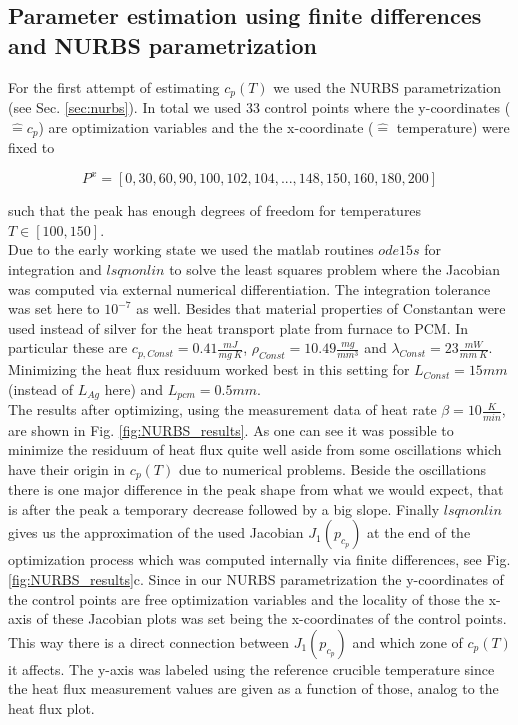 \documentclass{scrartcl}[12pt, halfparskip]
\numberwithin{equation}{section}
\numberwithin{figure}{section}
\numberwithin{table}{section}
\begin{document}
\subsection{Parameter estimation using finite differences and NURBS parametrization}

For the first attempt of estimating $c_p(T)$  we used the NURBS parametrization (see Sec. \ref{sec:nurbs}). In total we used 33 control points where the y-coordinates ($\hat{=} c_p$) are optimization variables and the the x-coordinate ($\hat{=}$ temperature) were fixed to 

\begin{equation}
	P^x = [0, 30, 60, 90, 100, 102, 104, ..., 148, 150, 160, 180, 200]
\end{equation}

such that the peak has enough degrees of freedom for temperatures $T \in [100, 150]$. \\
Due to the early working state we used the matlab routines $ode15s$ for integration and $lsqnonlin$ to solve the least squares problem where the Jacobian was computed via external numerical differentiation. The integration tolerance was set here to $10^{-7}$ as well. Besides that material properties of Constantan were used instead of silver for the heat transport plate from furnace to PCM. In particular these are $c_{p,Const}=0.41\frac{mJ}{mg \ K}$, $\rho_{Const}=10.49\frac{mg}{mm^3}$ and $\lambda_{Const}=23\frac{mW}{mm \ K}$. \\
Minimizing the heat flux residuum worked best in this setting for $L_{Const}=15mm$ (instead of $L_{Ag}$ here) and $L_{pcm}=0.5mm$. \\
The results after optimizing, using the measurement data of heat rate $\beta = 10 \frac{K}{min}$, are shown in Fig. \ref{fig:NURBS_results}. As one can see it was possible to minimize the residuum of heat flux quite well aside from some oscillations which have their origin in $c_p(T)$ due to numerical problems. Beside the oscillations there is one major difference in the peak shape from what we would expect, that is after the peak a temporary decrease followed by a big slope.
Finally $lsqnonlin$ gives us the approximation of the used Jacobian $J_1(p_{c_p})$ at the end of the optimization process which was computed internally via finite differences, see Fig. \ref{fig:NURBS_results}c. Since in our NURBS parametrization the y-coordinates of the control points are free optimization variables and the locality of those the x-axis of these Jacobian plots was set being the x-coordinates of the control points. This way there is a direct connection between $J_1(p_{c_p})$ and which zone of $c_p(T)$ it affects. The y-axis was labeled using the reference crucible temperature since the heat flux measurement values are given as a function of those, analog to the heat flux plot.
\end{document}

